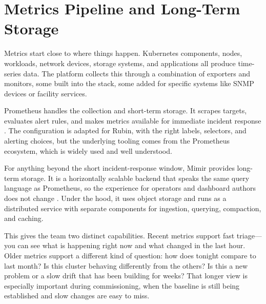 \section{Metrics Pipeline and Long-Term Storage}

Metrics start close to where things happen. Kubernetes components, nodes, workloads, network
devices, storage systems, and applications all produce time-series data. The platform collects this
through a combination of exporters and monitors, some built into the stack, some added for specific
systems like SNMP devices or facility services.

Prometheus handles the collection and short-term storage. It scrapes targets, evaluates alert
rules, and makes metrics available for immediate incident response
\cite{lsst-it-k8s-cookbook,prometheus-operator,prometheus-alerting}. The configuration is adapted
for Rubin, with the right labels, selectors, and alerting choices, but the underlying tooling comes
from the Prometheus ecosystem, which is widely used and well understood.

For anything beyond the short incident-response window, Mimir provides long-term storage. It is a
horizontally scalable backend that speaks the same query language as Prometheus, so the experience
for operators and dashboard authors does not change \cite{grafana-mimir}. Under the hood, it uses
object storage and runs as a distributed service with separate components for ingestion, querying,
compaction, and caching.

This gives the team two distinct capabilities. Recent metrics support fast triage---you can see
what is happening right now and what changed in the last hour. Older metrics support a different
kind of question: how does tonight compare to last month? Is this cluster behaving differently from
the others? Is this a new problem or a slow drift that has been building for weeks? That longer
view is especially important during commissioning, when the baseline is still being established and
slow changes are easy to miss.
